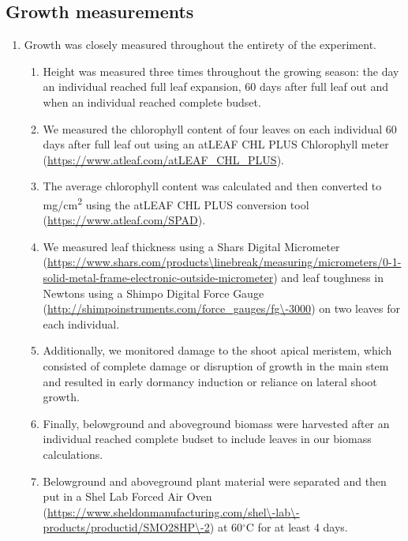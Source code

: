 \documentclass{article}\usepackage[]{graphicx}\usepackage[]{color}
\begin{document}
\subsection*{Growth measurements}
\begin{enumerate}
\item Growth was closely measured throughout the entirety of the experiment. 
  \begin{enumerate}
  \item Height was measured three times throughout the growing season: the day an individual reached full leaf expansion, 60 days after full leaf out and when an individual reached complete budset. 
  \item We measured the chlorophyll content of four leaves on each individual 60 days after full leaf out using an atLEAF CHL PLUS Chlorophyll meter (\url{https://www.atleaf.com/atLEAF\_CHL\_PLUS}).
  \item The average chlorophyll content was calculated and then converted to mg/cm\textsuperscript{2} using the atLEAF CHL PLUS conversion tool (\url{https://www.atleaf.com/SPAD}).
  \item We measured leaf thickness using a Shars Digital Micrometer (\url{https://www.shars.com/products\linebreak/measuring/micrometers/0-1-solid-metal-frame-electronic-outside-micrometer}) and leaf toughness in Newtons using a Shimpo Digital Force Gauge (\url{http://shimpoinstruments.com/force\_gauges/fg\-3000}) on two leaves for each individual.
  \item Additionally, we monitored damage to the shoot apical meristem, which consisted of complete damage or disruption of growth in the main stem and resulted in early dormancy induction or reliance on lateral shoot growth.
  \item Finally, belowground and aboveground biomass were harvested after an individual reached complete budset to include leaves in our biomass calculations. 
  \item Belowground and aboveground plant material were separated and then put in a Shel Lab Forced Air Oven (\url{https://www.sheldonmanufacturing.com/shel\-lab\-products/productid/SMO28HP\-2}) at 60$^{\circ}$C for at least 4 days. 
  \end{enumerate}
\end{enumerate}
\end{document}
